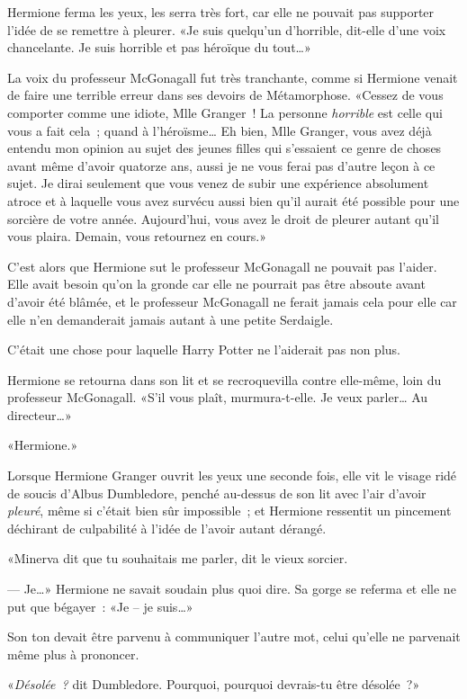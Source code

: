 Hermione ferma les yeux, les serra très fort, car elle ne pouvait pas supporter l'idée de se remettre à pleurer. «Je suis quelqu'un d'horrible, dit-elle d'une voix chancelante. Je suis horrible et pas héroïque du tout…»

La voix du professeur McGonagall fut très tranchante, comme si Hermione venait de faire une terrible erreur dans ses devoirs de Métamorphose. «Cessez de vous comporter comme une idiote, Mlle Granger~! La personne \emph{horrible} est celle qui vous a fait cela~; quand à l'héroïsme… Eh bien, Mlle Granger, vous avez déjà entendu mon opinion au sujet des jeunes filles qui s'essaient ce genre de choses avant même d'avoir quatorze ans, aussi je ne vous ferai pas d'autre leçon à ce sujet. Je dirai seulement que vous venez de subir une expérience absolument atroce et à laquelle vous avez survécu aussi bien qu'il aurait été possible pour une sorcière de votre année. Aujourd'hui, vous avez le droit de pleurer autant qu'il vous plaira. Demain, vous retournez en cours.»

C'est alors que Hermione sut le professeur McGonagall ne pouvait pas l'aider. Elle avait besoin qu'on la gronde car elle ne pourrait pas être absoute avant d'avoir été blâmée, et le professeur McGonagall ne ferait jamais cela pour elle car elle n'en demanderait jamais autant à une petite Serdaigle.

C'était une chose pour laquelle Harry Potter ne l'aiderait pas non plus.

Hermione se retourna dans son lit et se recroquevilla contre elle-même, loin du professeur McGonagall. «S'il vous plaît, murmura-t-elle. Je veux parler… Au directeur…»

\later

«Hermione.»

Lorsque Hermione Granger ouvrit les yeux une seconde fois, elle vit le visage ridé de soucis d'Albus Dumbledore, penché au-dessus de son lit avec l'air d'avoir \emph{pleuré}, même si c'était bien sûr impossible~; et Hermione ressentit un pincement déchirant de culpabilité à l'idée de l'avoir autant dérangé.

«Minerva dit que tu souhaitais me parler, dit le vieux sorcier.

--- Je…» Hermione ne savait soudain plus quoi dire. Sa gorge se referma et elle ne put que bégayer~: «Je -- je suis…»

Son ton devait être parvenu à communiquer l'autre mot, celui qu'elle ne parvenait même plus à prononcer.

«\emph{Désolée~?} dit Dumbledore. Pourquoi, pourquoi devrais-tu être désolée~?»

